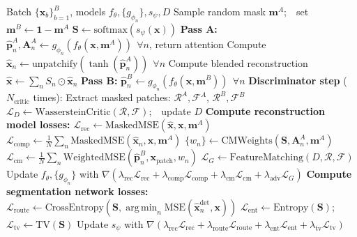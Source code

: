 \documentclass{article}
\DeclareMathOperator*{\argmin}{arg\,min}
\newcommand{\bx}{\mathbf{x}}
\newcommand{\bp}{\mathbf{p}}
\newcommand{\bA}{\mathbf{A}}
\begin{document}
\begin{algorithm}[t]
\caption{ComponentMAE training iteration}
\label{alg:training}
\begin{algorithmic}[1]
\Require Batch $\{\bx_b\}_{b=1}^B$, models $f_\theta, \{g_{\phi_n}\}, s_\psi, D$
\State Sample random mask $\mathbf{m}^A$;\ \ set $\mathbf{m}^B \gets \mathbf{1} - \mathbf{m}^A$
\State $\mathbf{S} \gets \mathrm{softmax}(s_\psi(\bx))$ 
\State \textbf{Pass A:} $\hat{\bp}_n^A, \bA_n^A \gets g_{\phi_n}(f_\theta(\bx, \mathbf{m}^A))\ \ \forall n$, return attention
\State Compute $\hat{\bx}_n \gets \mathrm{unpatchify}(\tanh(\hat{\bp}_n^A))\ \ \forall n$
\State Compute blended reconstruction $\hat{\bx} \gets \sum_n S_n \odot \hat{\bx}_n$
\State \textbf{Pass B:} $\hat{\bp}_n^B \gets g_{\phi_n}(f_\theta(\bx, \mathbf{m}^B))\ \ \forall n$
\State \textbf{Discriminator step} ($N_\mathrm{critic}$ times):
  \State \quad Extract masked patches: $\mathcal{R}^A, \mathcal{F}^A$, $\mathcal{R}^B, \mathcal{F}^B$
  \State \quad $\mathcal{L}_D \gets \mathrm{WassersteinCritic}(\mathcal{R}, \mathcal{F})$;\ \ update $D$
\State \textbf{Compute reconstruction model losses:}
  \State \quad $\mathcal{L}_\mathrm{rec} \gets \mathrm{MaskedMSE}(\hat{\bx}, \bx, \mathbf{m}^A)$
  \State \quad $\mathcal{L}_\mathrm{comp} \gets \frac{1}{N}\sum_n \mathrm{MaskedMSE}(\hat{\bx}_n, \bx, \mathbf{m}^A)$
  \State \quad $\{w_n\} \gets \mathrm{CMWeights}(\mathbf{S}, \bA_n^A, \mathbf{m}^A)$
  \State \quad $\mathcal{L}_\mathrm{cm} \gets \frac{1}{N}\sum_n \mathrm{WeightedMSE}(\hat{\bp}_n^B, \bx_\mathrm{patch}, w_n)$
  \State \quad $\mathcal{L}_G \gets \mathrm{FeatureMatching}(D, \mathcal{R}, \mathcal{F})$
  \State \quad Update $f_\theta, \{g_{\phi_n}\}$ with $\nabla(\lambda_\mathrm{rec}\mathcal{L}_\mathrm{rec} + \lambda_\mathrm{comp}\mathcal{L}_\mathrm{comp} + \lambda_\mathrm{cm}\mathcal{L}_\mathrm{cm} + \lambda_\mathrm{adv}\mathcal{L}_G)$
\State \textbf{Compute segmentation network losses:}
  \State \quad $\mathcal{L}_\mathrm{route} \gets \mathrm{CrossEntropy}(\mathbf{S}, \argmin_n \mathrm{MSE}(\hat{\bx}_n^{\text{det}}, \bx))$
  \State \quad $\mathcal{L}_\mathrm{ent} \gets \mathrm{Entropy}(\mathbf{S})$;\ \ $\mathcal{L}_\mathrm{tv} \gets \mathrm{TV}(\mathbf{S})$
  \State \quad Update $s_\psi$ with $\nabla(\lambda_\mathrm{rec}\mathcal{L}_\mathrm{rec} + \lambda_\mathrm{route}\mathcal{L}_\mathrm{route} + \lambda_\mathrm{ent}\mathcal{L}_\mathrm{ent} + \lambda_\mathrm{tv}\mathcal{L}_\mathrm{tv})$
\end{algorithmic}
\end{algorithm}
\end{document}
